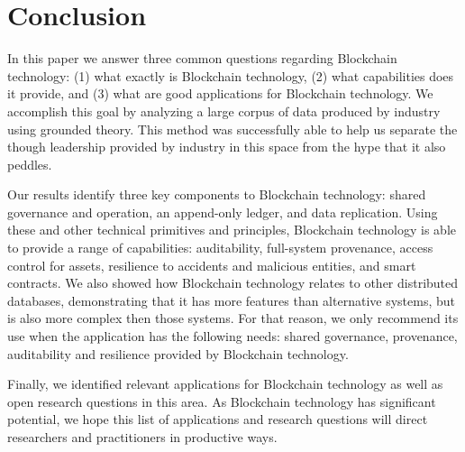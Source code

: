 
\section{Conclusion}
In this paper we answer three common questions regarding Blockchain technology: (1) what exactly is Blockchain technology, (2) what capabilities does it provide, and (3) what are good applications for Blockchain technology.
We accomplish this goal by analyzing a large corpus of data produced by industry using grounded theory.
This method was successfully able to help us separate the though leadership provided by industry in this space from the hype that it also peddles.



Our results identify three key components to Blockchain technology: shared governance and operation, an append-only ledger, and data replication.
Using these and other technical primitives and principles, Blockchain technology is able to provide a range of capabilities: auditability, full-system provenance, access control for assets, resilience to accidents and malicious entities, and smart contracts.
We also showed how Blockchain technology relates to other distributed databases, demonstrating that it has more features than alternative systems, but is also more complex then those systems.
For that reason, we only recommend its use when the application has the following needs: shared governance, provenance, auditability and resilience provided by Blockchain technology.

Finally, we identified relevant applications for Blockchain technology as well as open research questions in this area.
As Blockchain technology has significant potential, we hope this list of applications and research questions will direct researchers and practitioners in productive ways.